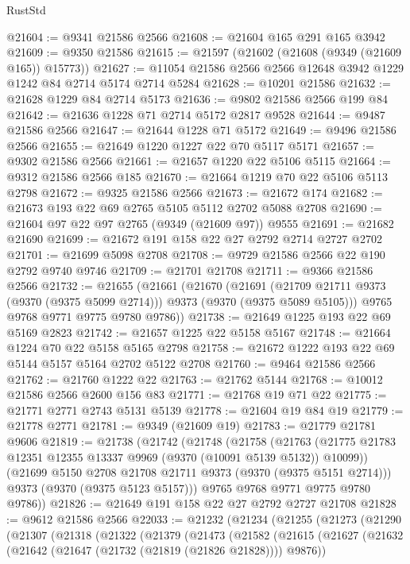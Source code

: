 \begin{lexlean}{RustStd}
\begin{coremodule}
@21604 := @9341 @21586 @2566
@21608 := @21604 @165 @291 @165 @3942
@21609 := @9350 @21586
@21615 := @21597 (@21602 (@21608 (@9349 (@21609 @165)) @15773))
@21627 := @11054 @21586 @2566 @2566 @12648 @3942 @1229 @1242 @84 @2714 @5174 @2714 @5284
@21628 := @10201 @21586
@21632 := @21628 @1229 @84 @2714 @5173
@21636 := @9802 @21586 @2566 @199 @84
@21642 := @21636 @1228 @71 @2714 @5172 @2817 @9528
@21644 := @9487 @21586 @2566
@21647 := @21644 @1228 @71 @5172
@21649 := @9496 @21586 @2566
@21655 := @21649 @1220 @1227 @22 @70 @5117 @5171
@21657 := @9302 @21586 @2566
@21661 := @21657 @1220 @22 @5106 @5115
@21664 := @9312 @21586 @2566 @185
@21670 := @21664 @1219 @70 @22 @5106 @5113 @2798
@21672 := @9325 @21586 @2566
@21673 := @21672 @174
@21682 := @21673 @193 @22 @69 @2765 @5105 @5112 @2702 @5088 @2708
@21690 := @21604 @97 @22 @97 @2765 (@9349 (@21609 @97)) @9555
@21691 := @21682 @21690
@21699 := @21672 @191 @158 @22 @27 @2792 @2714 @2727 @2702
@21701 := @21699 @5098 @2708
@21708 := @9729 @21586 @2566 @22 @190 @2792 @9740 @9746
@21709 := @21701 @21708
@21711 := @9366 @21586 @2566
@21732 := @21655
    (@21661
      (@21670
        (@21691 (@21709 @21711 @9373 (@9370 (@9375 @5099 @2714))) @9373 (@9370 (@9375 @5089 @5105)))
        @9765
        @9768
        @9771
        @9775
        @9780
        @9786))
@21738 := @21649 @1225 @193 @22 @69 @5169 @2823
@21742 := @21657 @1225 @22 @5158 @5167
@21748 := @21664 @1224 @70 @22 @5158 @5165 @2798
@21758 := @21672 @1222 @193 @22 @69 @5144 @5157 @5164 @2702 @5122 @2708
@21760 := @9464 @21586 @2566
@21762 := @21760 @1222 @22
@21763 := @21762 @5144
@21768 := @10012 @21586 @2566 @2600 @156 @83
@21771 := @21768 @19 @71 @22
@21775 := @21771 @2771 @2743 @5131 @5139
@21778 := @21604 @19 @84 @19
@21779 := @21778 @2771
@21781 := @9349 (@21609 @19)
@21783 := @21779 @21781 @9606
@21819 := @21738
    (@21742
      (@21748
        (@21758
          (@21763 (@21775 @21783 @12351 @12355 @13337 @9969 (@9370 (@10091 @5139 @5132)) @10099))
          (@21699 @5150 @2708 @21708 @21711 @9373 (@9370 (@9375 @5151 @2714)))
          @9373
          (@9370 (@9375 @5123 @5157)))
        @9765
        @9768
        @9771
        @9775
        @9780
        @9786))
@21826 := @21649 @191 @158 @22 @27 @2792 @2727 @21708
@21828 := @9612 @21586 @2566
@22033 := @21232
    (@21234
      (@21255
        (@21273
          (@21290
            (@21307
              (@21318
                (@21322
                  (@21379
                    (@21473
                      (@21582
                        (@21615
                          (@21627
                            (@21632 (@21642 (@21647 (@21732 (@21819 (@21826 @21828)))) @9876))

\end{coremodule}
\end{lexlean}
